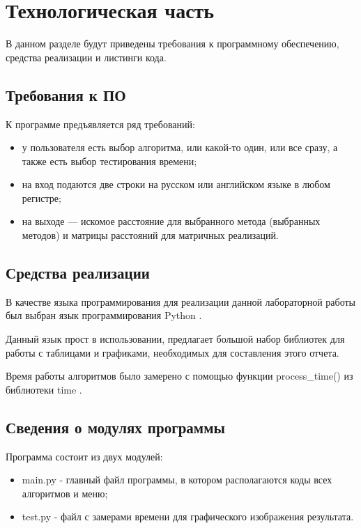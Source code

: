 \chapter{Технологическая часть}

В данном разделе будут приведены требования к программному обеспечению, средства реализации и листинги кода.

\section{Требования к ПО}

К программе предъявляется ряд требований:
\begin{itemize}
	\item у пользователя есть выбор алгоритма, или какой-то один, или все сразу, а также есть выбор тестирования времени;
	\item на вход подаются две строки на русском или английском языке в любом регистре;
	\item на выходе — искомое расстояние для выбранного метода (выбранных методов) и матрицы расстояний для матричных реализаций.
\end{itemize}

\section{Средства реализации}

В качестве языка программирования для реализации данной лабораторной работы был выбран язык программирования Python \cite{pythonlang}. 

Данный язык прост в использовании, предлагает большой набор библиотек для работы с таблицами и графиками,
необходимых для составления этого отчета.

Время работы алгоритмов было замерено с помощью функции \newline process\_time() из библиотеки time \cite{pythonlangtime}.

\section{Сведения о модулях программы}
Программа состоит из двух модулей:
\begin{itemize}
	\item main.py - главный файл программы, в котором располагаются коды всех алгоритмов и меню;
	\item test.py - файл с замерами времени для графического изображения результата.
\end{itemize}



